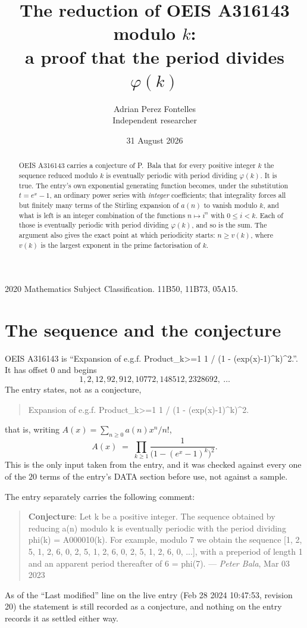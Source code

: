 \documentclass[11pt,a4paper]{article}
\title{The reduction of OEIS A316143 modulo $k$:\\ a proof that the period divides
$\varphi(k)$}
\author{Adrian Perez Fontelles\\ \small Independent researcher}
\date{31 August 2026}
\theoremstyle{plain}
\theoremstyle{definition}
\begin{document}
\maketitle

\begin{abstract}
OEIS A316143 carries a conjecture of P.~Bala that for every positive integer $k$ the
sequence reduced modulo $k$ is eventually periodic with period dividing $\varphi(k)$.
It is true. The entry's own exponential generating function becomes, under the
substitution $t=e^{x}-1$, an ordinary power series with \emph{integer} coefficients;
that integrality forces all but finitely many terms of the Stirling expansion of $a(n)$
to vanish modulo $k$, and what is left is an integer combination of the functions
$n\mapsto i^{n}$ with $0\le i<k$. Each of those is eventually periodic with period
dividing $\varphi(k)$, and so is the sum. The argument also gives the exact point at
which periodicity starts: $n\ge v(k)$, where $v(k)$ is the largest exponent in the
prime factorisation of $k$.
\end{abstract}

\noindent\small 2020 Mathematics Subject Classification. 11B50, 11B73, 05A15.\normalsize

\section{The sequence and the conjecture}

OEIS A316143 is ``Expansion of e.g.f. Product\_{k>=1} 1 / (1 - (exp(x)-1)\^{}k)\^{}2.''. It has offset $0$ and begins
\[
1, 2, 12, 92, 912, 10772, 148512, 2328692,\ \dots
\]
The entry states, not as a conjecture,
\begin{quote}\small
Expansion of e.g.f. Product\_{k>=1} 1 / (1 - (exp(x)-1)\^{}k)\^{}2.
\end{quote}
that is, writing $A(x)=\sum_{n\ge 0}a(n)x^{n}/n!$,
\begin{equation}\label{eq:egf}
A(x)\;=\;\prod_{k\ge 1}\frac{1}{\bigl(1-(e^{x}-1)^{k}\bigr)^{2}}.
\end{equation}
This is the only input taken from the entry, and it was checked against every one of the
$20$ terms of the entry's DATA section before use, not against a sample.

The entry separately carries the following comment:
\begin{quote}\small
\textbf{Conjecture}: Let k be a positive integer. The sequence obtained by reducing a(n) modulo k is eventually periodic with the period dividing phi(k) = A000010(k). For example, modulo 7 we obtain the sequence [1, 2, 5, 1, 2, 6, 0, 2, 5, 1, 2, 6, 0, 2, 5, 1, 2, 6, 0, ...], with a preperiod of length 1 and an apparent period thereafter of 6 = phi(7). --- \emph{Peter Bala}, Mar 03 2023
\end{quote}
As of the ``Last modified'' line on the live entry (Feb 28 2024 10:47:53, revision
20) the statement is still recorded as a conjecture, and nothing on the entry
records it as settled either way.
\end{document}
